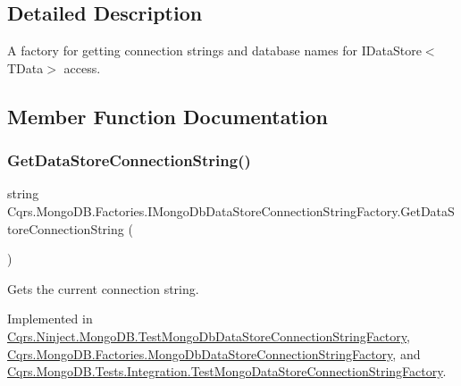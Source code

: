 \subsection{Detailed Description}
A factory for getting connection strings and database names for I\+Data\+Store$<$\+T\+Data$>$ access. 



\subsection{Member Function Documentation}
\mbox{\label{interfaceCqrs_1_1MongoDB_1_1Factories_1_1IMongoDbDataStoreConnectionStringFactory_a31cb87fb2cf1435912f635394494ed91_a31cb87fb2cf1435912f635394494ed91}} 
\subsubsection{\texorpdfstring{Get\+Data\+Store\+Connection\+String()}{GetDataStoreConnectionString()}}
{\footnotesize\ttfamily string Cqrs.\+Mongo\+D\+B.\+Factories.\+I\+Mongo\+Db\+Data\+Store\+Connection\+String\+Factory.\+Get\+Data\+Store\+Connection\+String (\begin{DoxyParamCaption}{ }\end{DoxyParamCaption})}



Gets the current connection string. 



Implemented in \hyperlink{classCqrs_1_1Ninject_1_1MongoDB_1_1TestMongoDbDataStoreConnectionStringFactory_abc9f81219c65af4182635cd545282b65_abc9f81219c65af4182635cd545282b65}{Cqrs.\+Ninject.\+Mongo\+D\+B.\+Test\+Mongo\+Db\+Data\+Store\+Connection\+String\+Factory}, \hyperlink{classCqrs_1_1MongoDB_1_1Factories_1_1MongoDbDataStoreConnectionStringFactory_a76986fcc9521c87bfbb6e417ef13cd53_a76986fcc9521c87bfbb6e417ef13cd53}{Cqrs.\+Mongo\+D\+B.\+Factories.\+Mongo\+Db\+Data\+Store\+Connection\+String\+Factory}, and \hyperlink{classCqrs_1_1MongoDB_1_1Tests_1_1Integration_1_1TestMongoDataStoreConnectionStringFactory_a520a0722aa91ed6144e4e86213ea13da_a520a0722aa91ed6144e4e86213ea13da}{Cqrs.\+Mongo\+D\+B.\+Tests.\+Integration.\+Test\+Mongo\+Data\+Store\+Connection\+String\+Factory}.

